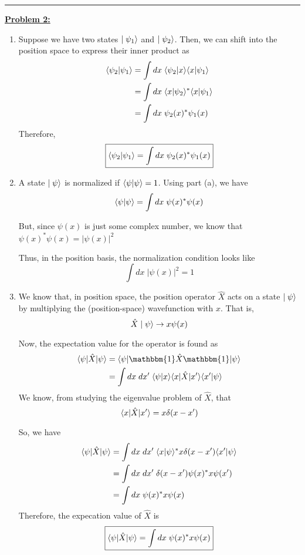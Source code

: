 \documentclass[twoside]{article}
\begin{document}
\vskip 0.5cm
\hrule
\vskip 0.5cm

\underline{\textbf{Problem 2:}}

\begin{enumerate}
   \item Suppose we have two states $\mid\psi_1\rangle$ and $\mid\psi_2\rangle$. Then, we can shift into the position space to express their inner product as
   \begin{align*}
      \langle \psi_2 | \psi_1 \rangle &= \int dx\; \langle \psi_2 | x \rangle \langle x | \psi_1 \rangle \\
                             &= \int dx\; \langle x | \psi_2 \rangle^{*} \langle x | \psi_1 \rangle \\
                             &= \int dx\; \psi_2(x)^{*} \psi_1(x)
   \end{align*}
   Therefore, 
   \[ \boxed{\langle \psi_2 | \psi_1 \rangle = \int dx\; \psi_2(x)^{*} \psi_1(x)} \]

   \item A state $\mid\psi\rangle$ is normalized if $\langle \psi | \psi \rangle = 1$. Using part (a), we have 
   \[ \langle \psi | \psi \rangle = \int dx\; \psi(x)^{*} \psi(x)  \]

   But, since $\psi(x)$ is just some complex number, we know that $\psi(x)^{*} \psi(x) = |\psi(x)|^2$

   Thus, in the position basis, the normalization condition looks like
   \[ \boxed{\int dx\; |\psi(x)|^2 = 1} \]

   \item We know that, in position space, the position operator $\hat{X}$ acts on a state $\mid\psi\rangle$ by multiplying the (position-space) wavefunction with $x$. That is,
   \[ \hat{X}\mid\psi\rangle \rightarrow x\psi(x) \]

   Now, the expectation value for the operator is found as 
   \begin{align*}
      \inner{\psi}{\hat{X}|\psi} &= \inner{\psi}{\mathbbm{1}\hat{X}\mathbbm{1}|\psi} \\
                                 &= \int dx\;dx'\; \inner{\psi}{x} \inner{x}{\hat{X}|x'} \inner{x'}{\psi}
   \end{align*}
   We know, from studying the eigenvalue problem of $\hat{X}$, that 
   \[ \langle x | \hat{X}|x' \rangle = x\delta(x-x') \]

   So, we have 
   \begin{align*}
      \langle \psi | \hat{X}|\psi \rangle &= \int dx\;dx'\; \langle x | \psi \rangle^{*} x\delta(x-x') \langle x' | \psi \rangle \\
                                 &= \int dx\;dx'\;\delta(x-x') \psi(x)^{*} x \psi(x') \\
                                 &= \int dx\; \psi(x)^{*} x \psi(x)
   \end{align*}
   Therefore, the expecation value of $\hat{X}$ is 
   \[ \boxed{\langle \psi | \hat{X}|\psi \rangle = \int dx\; \psi(x)^{*} x \psi(x)} \]


\end{enumerate}
\end{document}
